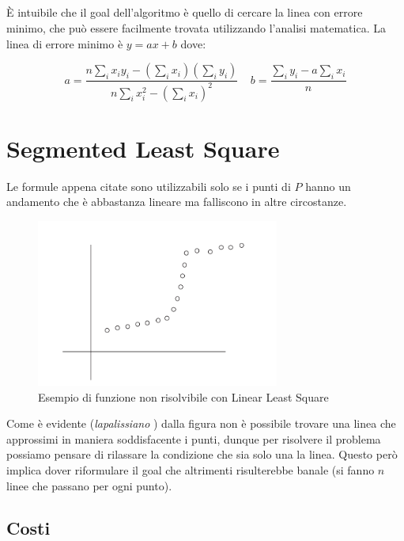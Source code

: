 \subsection{\goal}

È intuibile che il goal dell'algoritmo è quello di cercare la linea con errore
minimo, che può essere facilmente trovata utilizzando l'analisi matematica.
La linea di errore minimo è $y = ax + b$ dove:

\[
    a = \frac{n \sum_{i} x_i y_i - (\sum_{i} x_i) (\sum_{i} y_i)}{n \sum_{i} x_i^2 - (\sum_{i} x_i)^2} \ \ \  \ \ b = \frac{\sum_{i} y_i - a \sum_{i} x_i}{n}
\]

\section{Segmented Least Square}

Le formule appena citate sono utilizzabili solo se i punti di $P$ hanno un
andamento che è abbastanza lineare ma falliscono in altre circostanze.

\begin{figure}[H]
    \centering
    \includegraphics[width=8cm, keepaspectratio]{capitoli/imgs/segmente_linear_least.png}
    \caption{Esempio di funzione non risolvibile con Linear Least Square}
\end{figure}

Come è evidente (\textit{lapalissiano }) dalla figura
non è possibile trovare una linea che approssimi in maniera soddisfacente i
punti, dunque per risolvere il problema possiamo pensare di rilassare la
condizione che sia solo una la linea. Questo però implica dover riformulare il
goal che altrimenti risulterebbe banale (si fanno $n$ linee che passano per ogni
punto).

\subsection{Costi}

